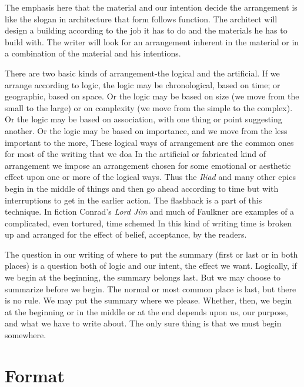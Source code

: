\documentclass[
    oneside,
    11pt,
]{memoir}
\begin{document}
The emphasis here that the material and our intention decide the arrangement is like the slogan in architecture that form follows function. The architect will design a building according to the job it has to do and the materials he has to build with. The writer will look for an arrangement inherent in the material or in a combination of the material and his intentions.

There are two basic kinds of arrangement-the logical and the artificial. If we arrange according to logic, the logic may be chronological, based on time; or geographic, based on space. Or the logic may be based on size (we move from the small to the large) or on complexity (we move from the simple to the complex). Or the logic may be based on association, with one thing or point suggesting another. Or the logic may be based on importance, and we move from the less important to the more, These logical ways of arrangement are the common ones for most of the writing that we doa In the artificial or fabricated kind of arrangement we impose an arrangement chosen for some emotional or aesthetic effect upon one or more of the logical ways. Thus the \emph{Iliad} and many other epics begin in the middle of things and then go ahead according to time but with interruptions to get in the earlier action. The flashback is a part of this technique. In fiction Conrad's \emph{Lord Jim} and much of Faulkner are examples of a complicated, even tortured, time schemed In this kind of writing time is broken up and arranged for the effect of belief, acceptance, by the readers.

The question in our writing of where to put the summary (first or last or in both places) is a question both of logic and our intent, the effect we want. Logically, if we begin at the beginning, the summary belongs last. But we may choose to summarize before we begin. The normal or most common place is last, but there is no rule. We may put the summary where we please. Whether, then, we begin at the beginning or in the middle or at the end depends upon us, our purpose, and what we have to write about. The only sure thing is that we must begin somewhere.

\chapter{Format}
\end{document}
